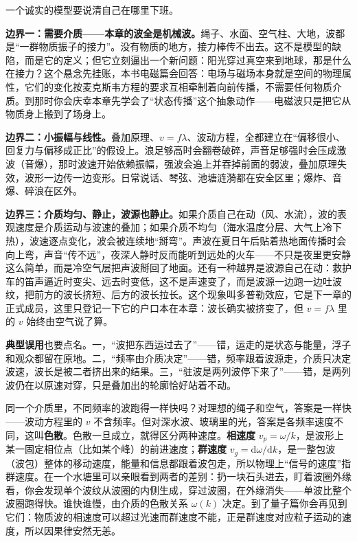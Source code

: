 \begin{mainline}
一个诚实的模型要说清自己在哪里下班。

\textbf{边界一：需要介质——本章的波全是机械波。}绳子、水面、空气柱、大地，波都是“一群物质振子的接力”。没有物质的地方，接力棒传不出去。这不是模型的缺陷，而是它的定义；但它立刻逼出一个新问题：阳光穿过真空来到地球，那是什么在接力？这个悬念先挂账，本书电磁篇会回答：电场与磁场本身就是空间的物理属性，它们的变化按麦克斯韦方程的要求互相牵制着向前传播，不需要任何物质介质。到那时你会庆幸本章先学会了“状态传播”这个抽象动作——电磁波只是把它从物质身上搬到了场身上。

\textbf{边界二：小振幅与线性。}叠加原理、\(v=f\lambda\)、波动方程，全都建立在“偏移很小、回复力与偏移成正比”的假设上。浪足够高时会翻卷破碎，声音足够强时会压成激波（音爆），那时波速开始依赖振幅，强波会追上并吞掉前面的弱波，叠加原理失效，波形一边传一边变形。日常说话、琴弦、池塘涟漪都在安全区里；爆炸、音爆、碎浪在区外。

\textbf{边界三：介质均匀、静止，波源也静止。}如果介质自己在动（风、水流），波的表观速度是介质运动与波速的叠加；如果介质不均匀（海水温度分层、大气上冷下热），波速逐点变化，波会被连续地“掰弯”。声波在夏日午后贴着热地面传播时会向上弯，声音“传不远”，夜深人静时反而能听到远处的火车——不只是夜里更安静这么简单，而是冷空气层把声波掰回了地面。还有一种越界是波源自己在动：救护车的笛声逼近时变尖、远去时变低，这不是声速变了，而是波源一边跑一边吐波纹，把前方的波长挤短、后方的波长拉长。这个现象叫多普勒效应，它是下一章的正式成员，这里只登记一下它的户口本在本章：波长确实被挤变了，但 \(v=f\lambda\) 里的 \(v\) 始终由空气说了算。

\textbf{典型误用}也要点名。一，“波把东西运过去了”——错，运走的是状态与能量，浮子和观众都留在原地。二，“频率由介质决定”——错，频率跟着波源走，介质只决定波速，波长是被二者挤出来的结果。三，“驻波是两列波停下来了”——错，是两列波仍在以原速对穿，只是叠加出的轮廓恰好站着不动。
\end{mainline}

\begin{challenge}
同一个介质里，不同频率的波跑得一样快吗？对理想的绳子和空气，答案是一样快——波动方程里的 \(v\) 不含频率。但对深水波、玻璃里的光，答案是各频率速度不同，这叫\textbf{色散}。色散一旦成立，就得区分两种速度。\textbf{相速度} \(v_p=\omega/k\)，是波形上某一固定相位点（比如某个峰）的前进速度；\textbf{群速度} \(v_g=\mathrm{d}\omega/\mathrm{d}k\)，是一整包波（波包）整体的移动速度，能量和信息都跟着波包走，所以物理上“信号的速度”指群速度。在一个水塘里可以亲眼看到两者的差别：扔一块石头进去，盯着波圈外缘看，你会发现单个波纹从波圈的内侧生成，穿过波圈，在外缘消失——单波比整个波圈跑得快。谁快谁慢，由介质的色散关系 \(\omega(k)\) 决定。到了量子篇你会再见到它们：物质波的相速度可以超过光速而群速度不能，正是群速度对应粒子运动的速度，所以因果律安然无恙。
\end{challenge}

